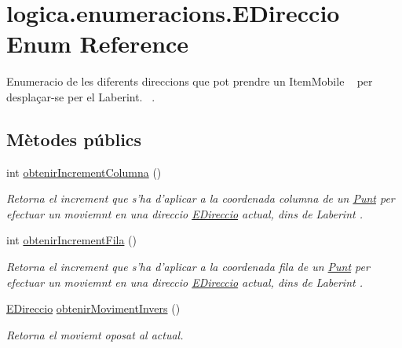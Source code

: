 \hypertarget{enumlogica_1_1enumeracions_1_1_e_direccio}{\section{logica.\+enumeracions.\+E\+Direccio Enum Reference}
\label{enumlogica_1_1enumeracions_1_1_e_direccio}
}


Enumeracio de les diferents direccions que pot prendre un Item\+Mobile ~\newline
per desplaçar-\/se per el Laberint.~\newline
.  


\subsection*{Mètodes públics}
\begin{DoxyCompactItemize}
\item 
\hypertarget{enumlogica_1_1enumeracions_1_1_e_direccio_ac95461b810966d7a55c313d3f74deedf}{int \hyperlink{enumlogica_1_1enumeracions_1_1_e_direccio_ac95461b810966d7a55c313d3f74deedf}{obtenir\+Increment\+Columna} ()}\label{enumlogica_1_1enumeracions_1_1_e_direccio_ac95461b810966d7a55c313d3f74deedf}

\begin{DoxyCompactList}\small\item\em Retorna el increment que s'ha d'aplicar a la coordenada columna de un \hyperlink{classlogica_1_1_punt}{Punt} per efectuar un moviemnt en una direccio \hyperlink{enumlogica_1_1enumeracions_1_1_e_direccio}{E\+Direccio} actual, dins de Laberint . \end{DoxyCompactList}\item 
\hypertarget{enumlogica_1_1enumeracions_1_1_e_direccio_ae89a8e6f2f3bdc9929a11de804980e33}{int \hyperlink{enumlogica_1_1enumeracions_1_1_e_direccio_ae89a8e6f2f3bdc9929a11de804980e33}{obtenir\+Increment\+Fila} ()}\label{enumlogica_1_1enumeracions_1_1_e_direccio_ae89a8e6f2f3bdc9929a11de804980e33}

\begin{DoxyCompactList}\small\item\em Retorna el increment que s'ha d'aplicar a la coordenada fila de un \hyperlink{classlogica_1_1_punt}{Punt} per efectuar un moviemnt en una direccio \hyperlink{enumlogica_1_1enumeracions_1_1_e_direccio}{E\+Direccio} actual, dins de Laberint . \end{DoxyCompactList}\item 
\hyperlink{enumlogica_1_1enumeracions_1_1_e_direccio}{E\+Direccio} \hyperlink{enumlogica_1_1enumeracions_1_1_e_direccio_a7063f6f72b73cb481b8473fdf02b5f06}{obtenir\+Moviment\+Invers} ()
\begin{DoxyCompactList}\small\item\em Retorna el moviemt oposat al actual. \end{DoxyCompactList}\end{DoxyCompactItemize}
